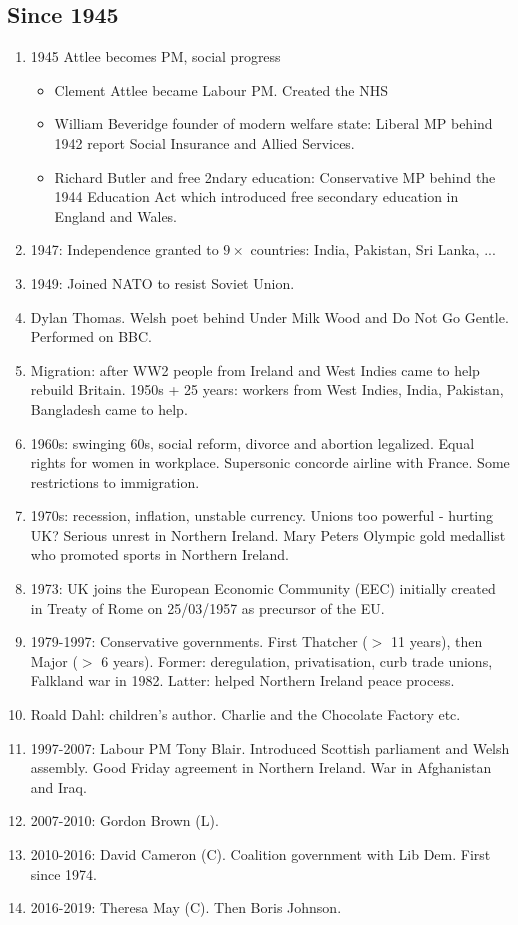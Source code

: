 \documentclass{amsart}
\begin{document}
\subsection{Since 1945}

\begin{enumerate}
\item 1945 Attlee becomes PM, social progress
	\begin{itemize}
		\item Clement Attlee became Labour PM. Created the NHS
		\item William Beveridge founder of modern welfare state: Liberal MP behind 1942 report Social Insurance and Allied Services.
		\item Richard Butler and free 2ndary education: Conservative MP behind the 1944 Education Act which introduced free secondary education in England and Wales. 
	\end{itemize}
\item 1947: Independence granted to $9\times$ countries: India, Pakistan, Sri Lanka, ...
\item 1949: Joined NATO to resist Soviet Union. 
\item Dylan Thomas. Welsh poet behind Under Milk Wood and Do Not Go Gentle. Performed on BBC. 
\item Migration: after WW2 people from Ireland and West Indies came to help rebuild Britain.
1950s + 25 years: workers from West Indies, India, Pakistan, Bangladesh came to help. 
\item 1960s: swinging 60s, social reform, divorce and abortion legalized. Equal rights for women in workplace. Supersonic concorde airline with France. Some restrictions to immigration. 
\item 1970s: recession, inflation, unstable currency. Unions too powerful - hurting UK? Serious unrest in Northern Ireland. 
Mary Peters Olympic gold medallist who promoted sports in Northern Ireland. 
\item 1973: UK joins the European Economic Community (EEC) initially created in Treaty of Rome on 25/03/1957 as precursor of the EU. 
\item 1979-1997: Conservative governments. First Thatcher ($>$ 11 years), then Major ($>$ 6 years). Former: deregulation, privatisation, curb trade unions, Falkland war in 1982. Latter: helped Northern Ireland peace process. 
\item Roald Dahl: children's author. Charlie and the Chocolate Factory etc. 
\item 1997-2007: Labour PM Tony Blair. Introduced Scottish parliament and Welsh assembly. Good Friday agreement in Northern Ireland. War in Afghanistan and Iraq. 
\item 2007-2010: Gordon Brown (L).
\item 2010-2016: David Cameron (C). Coalition government with Lib Dem. First since 1974. 
\item 2016-2019: Theresa May (C). Then Boris Johnson. 
\end{enumerate}
\end{document}
